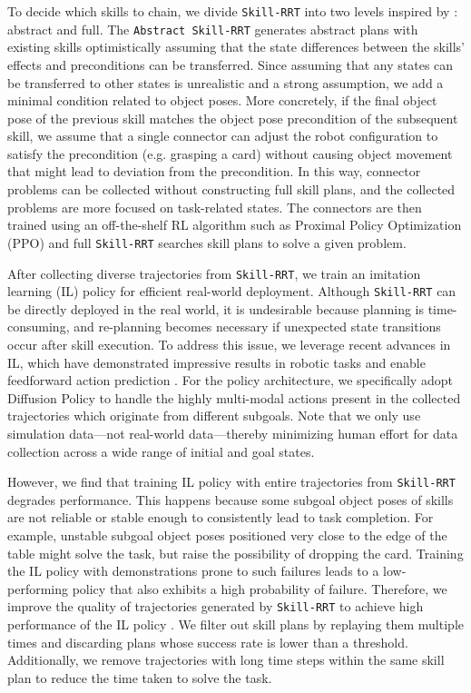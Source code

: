  
To decide which skills to chain, we divide \texttt{Skill-RRT} into two levels inspired by \cite{kaelbling2011hierarchical}: abstract and full. The \texttt{Abstract Skill-RRT} generates abstract plans with existing skills optimistically assuming that the state differences between the skills' effects and preconditions can be transferred. Since assuming that any states can be transferred to other states is unrealistic and a strong assumption, we add a minimal condition related to object poses. More concretely, if the final object pose of the previous skill matches the object pose precondition of the subsequent skill, we assume that a single connector can adjust the robot configuration to satisfy the precondition (e.g. grasping a card) without causing object movement that might lead to deviation from the precondition. In this way, connector problems can be collected without constructing full skill plans, and the collected problems are more focused on task-related states. The connectors are then trained using an off-the-shelf RL algorithm such as Proximal Policy Optimization (PPO) \cite{schulman2017proximal} and full \texttt{Skill-RRT} searches skill plans to solve a given problem.

 

After collecting diverse trajectories from \texttt{Skill-RRT}, we train an imitation learning (IL) policy for efficient real-world deployment. Although \texttt{Skill-RRT} can be directly deployed in the real world, it is undesirable because planning is time-consuming, and re-planning becomes necessary if unexpected state transitions occur after skill execution. To address this issue, we leverage recent advances in IL, which have demonstrated impressive results in robotic tasks and enable feedforward action prediction \cite{Zhao-RSS-23, chi2023diffusion, Reuss-RSS-23}. For the policy architecture, we specifically adopt Diffusion Policy \cite{chi2023diffusion} to handle the highly multi-modal actions present in the collected trajectories which originate from different subgoals. Note that we only use simulation data—not real-world data—thereby minimizing human effort for data collection across a wide range of initial and goal states.

 
However, we find that training IL policy with entire trajectories from \texttt{Skill-RRT} degrades performance. This happens because some subgoal object poses of skills are not reliable or stable enough to consistently lead to task completion. For example, unstable subgoal object poses positioned very close to the edge of the table might solve the task, but raise the possibility of dropping the card. Training the IL policy with demonstrations prone to such failures leads to a low-performing policy that also exhibits a high probability of failure. Therefore, we improve the quality of trajectories generated by \texttt{Skill-RRT} to achieve high performance of the IL policy \cite{mandlekar2022matters, dalal2023imitating}. We filter out skill plans by replaying them multiple times and discarding plans whose success rate is lower than a threshold. Additionally, we remove trajectories with long time steps within the same skill plan to reduce the time taken to solve the task.

